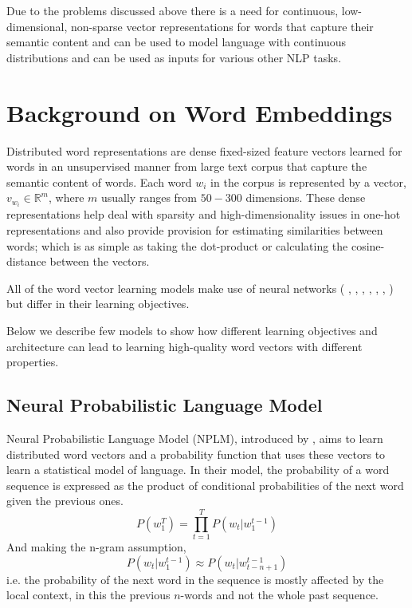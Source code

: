 Due to the problems discussed above there is a need for continuous, low-dimensional, non-sparse vector representations for words that capture their semantic content and can be used to model language with continuous distributions and can be used as inputs for various other NLP tasks. 

\section{Background on Word Embeddings}
\label{sec:background_distributed}
Distributed word representations are dense fixed-sized feature vectors learned for words in an unsupervised manner from large text corpus that capture the semantic content of words. Each word $w_{i}$ in the corpus is represented by a vector, $v_{w_{i}} \in \mathbb{R}^{m}$, where $m$ usually ranges from $50-300$ dimensions. These dense representations help deal with sparsity and high-dimensionality issues in one-hot representations and also provide provision for estimating similarities between words; which is as simple as taking the dot-product or calculating the cosine-distance between the vectors. 

All of the word vector learning models make use of neural networks  ( \citep{bengio2003neural}, \citep{mnih2013learning}, \citep{mikolov2013distributed}, \citep{collobert2011natural}, \citep{bottou2014machine}, \citep{turian2010word}, \citep{levy2014dependencybased} ) but differ in their learning objectives. 

Below we describe few models to show how different learning objectives and architecture can lead to learning high-quality word vectors with different properties.

\subsection{Neural Probabilistic Language Model}
\label{sec:bengio}
Neural Probabilistic Language Model (NPLM), introduced by \cite{bengio2003neural}, aims to learn distributed word vectors and a probability function that uses these vectors to learn a statistical model of language. In their model, the probability of a word sequence is expressed as the product of conditional probabilities of the next word given the previous ones. 
\begin{equation}
P(w_{1}^{T}) =  \prod_{t=1}^{T} P(w_{t}| w_{1}^{t-1})
\end{equation}
And making the n-gram assumption, 
\begin{equation}
P(w_{t} | w_{1}^{t-1}) \approx P(w_{t} | w_{t-n+1}^{t-1})
\end{equation}
i.e. the probability of the next word in the sequence is mostly affected by the local context, in this the previous $n$-words and not the whole past sequence.

